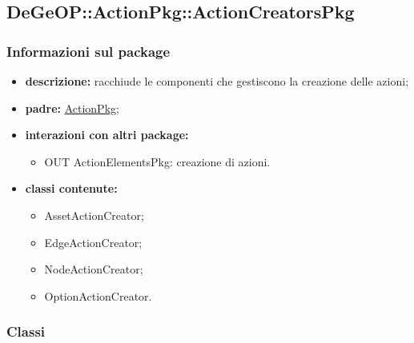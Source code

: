 \subsection{DeGeOP::ActionPkg::ActionCreatorsPkg}
\label{pkg::ActionCreatorsPkg}
\subsubsection{Informazioni sul package}
\begin{itemize}
	\item \textbf{descrizione:} racchiude le componenti che gestiscono la creazione delle azioni;
	\item \textbf{padre:} \hyperref[pkg::ActionPkg]{ActionPkg};
	\item \textbf{interazioni con altri package:} 
	\begin{itemize}
		\item OUT ActionElementsPkg: creazione di azioni.
	\end{itemize}
	\item \textbf{classi contenute:}
	\begin{itemize}
		\item AssetActionCreator;
		\item EdgeActionCreator;
		\item NodeActionCreator;
		\item OptionActionCreator.
	\end{itemize}
\end{itemize}
\subsubsection{Classi}
